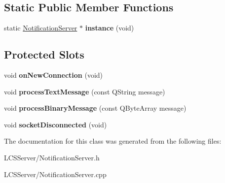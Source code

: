 \subsection*{Static Public Member Functions}
\begin{DoxyCompactItemize}
\item 
\mbox{\label{class_notification_server_a44b03b731cade32841e472283f264f51}} 
static \hyperlink{class_notification_server}{Notification\+Server} $\ast$ {\bfseries instance} (void)
\end{DoxyCompactItemize}
\subsection*{Protected Slots}
\begin{DoxyCompactItemize}
\item 
\mbox{\label{class_notification_server_a7bf3b28c919b178ad8749beb9be4822e}} 
void {\bfseries on\+New\+Connection} (void)
\item 
\mbox{\label{class_notification_server_ab6cfeb3d264f611116162e30a15b16a5}} 
void {\bfseries process\+Text\+Message} (const Q\+String message)
\item 
\mbox{\label{class_notification_server_a377b34fac98a48cf025d80421ef85036}} 
void {\bfseries process\+Binary\+Message} (const Q\+Byte\+Array message)
\item 
\mbox{\label{class_notification_server_a7088db19422ae675874a6e61cbfc52c0}} 
void {\bfseries socket\+Disconnected} (void)
\end{DoxyCompactItemize}


The documentation for this class was generated from the following files\+:\begin{DoxyCompactItemize}
\item 
L\+C\+S\+Server/Notification\+Server.\+h\item 
L\+C\+S\+Server/Notification\+Server.\+cpp\end{DoxyCompactItemize}
